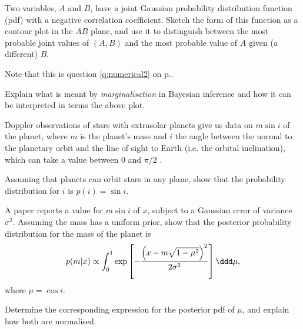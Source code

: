 \documentclass[compose]{exam-n}
\begin{document}
\begin{question}{30} 
Two variables, $A$ and $B$, have a joint Gaussian probability
distribution function (pdf) with a negative correlation
coefficient.  Sketch the form of this function as a contour plot
in the $AB$  plane, and use it to distinguish between the most
probable joint values of $(A,B)$  and the most probable value of
$A$ given (a different) $B$. 

\label{q:numerical2}
Note that this is question \ref{q:numerical2} on p.\pageref{q:numerical2}.

Explain what is meant by \emph{marginalisation} in Bayesian
inference and how it can be interpreted in terms the above plot.

Doppler observations of stars with extrasolar planets give us data
on $m\sin i$  of the planet, where $m$ is the planet's mass and
$i$ the angle between the normal to the planetary orbit and the
line of sight to Earth (i.e. the orbital inclination), which can
take a value between 0 and $\pi/2$ .

Assuming that planets can orbit stars in any plane, show that the
probability distribution for $i$ is $p(i) = \sin i$.

A paper reports a value for $m\sin i$  of $x$, subject to a Gaussian
error of variance $\sigma^2$.  Assuming the mass has a uniform
prior, show that the posterior probability distribution for the mass
of the planet is
\begin{equation*}
p(m|x)\propto\int_0^1\exp\left[-\frac{\left(x-m\sqrt{1-\mu^2}\right)^2}{2\sigma^2}\right]
\ddd \mu,
\end{equation*}
where $\mu=\cos i$.

Determine the corresponding expression for the posterior pdf of
$\mu$, and explain how both are normalised.
\end{question}
\end{document}
